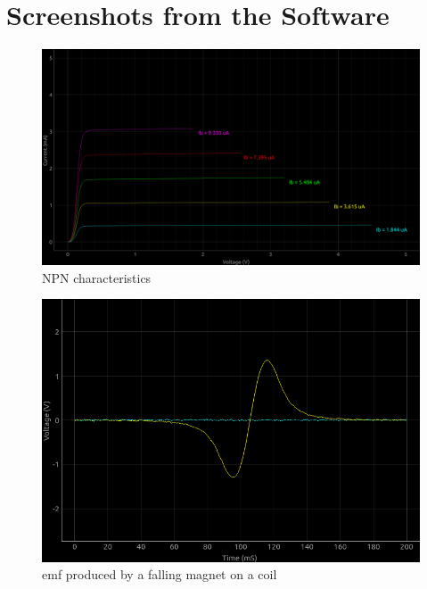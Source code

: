 \appendix
\section{Screenshots from the Software}

\begin{figure}[H]
	\centering
	\includegraphics[width=1\columnwidth]{data/npn.png}
	\caption{NPN characteristics}
\end{figure}

\begin{figure}[H]
	\centering
	\includegraphics[width=1\columnwidth]{data/m.png}
	\caption{emf produced by a falling magnet on a coil}
\end{figure}

